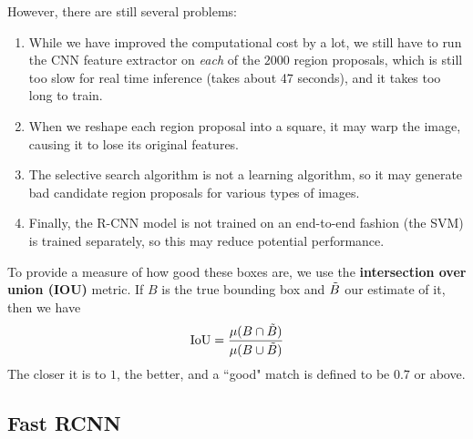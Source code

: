 \documentclass{article}
\begin{document}
    However, there are still several problems: 
    \begin{enumerate}
        \item While we have improved the computational cost by a lot, we still have to run the CNN feature extractor on \textit{each} of the $2000$ region proposals, which is still too slow for real time inference (takes about 47 seconds), and it takes too long to train. 
        \item When we reshape each region proposal into a square, it may warp the image, causing it to lose its original features. 
        \item The selective search algorithm is not a learning algorithm, so it may generate bad candidate region proposals for various types of images.  
        \item Finally, the R-CNN model is not trained on an end-to-end fashion (the SVM) is trained separately, so this may reduce potential performance. 
    \end{enumerate} 

    \begin{definition}[IOU]
    To provide a measure of how good these boxes are, we use the \textbf{intersection over union (IOU)} metric. If $B$ is the true bounding box and $\Tilde{B}$ our estimate of it, then we have 
    \[\mathrm{IoU} = \frac{\mu(B \cap \Tilde{B})}{\mu(B \cup \Tilde{B})}\]
    The closer it is to $1$, the better, and a ``good" match is defined to be $0.7$ or above.  
    \end{definition} 

  \subsection{Fast RCNN}
\end{document}
